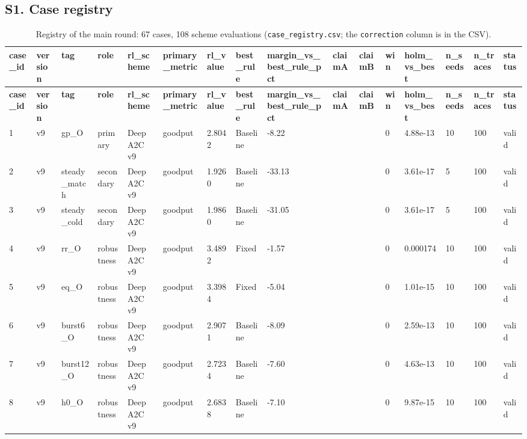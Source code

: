 \documentclass[10pt]{article}
\begin{document}
\begin{landscape}
\section{S1. Case registry}
\tiny
\setlength{\tabcolsep}{1.6pt}
\begin{longtable}{@{}llllllllllllllll@{}}
\caption{Registry of the main round: 67 cases, 108 scheme evaluations (\texttt{case\_registry.csv}; the \texttt{correction} column is in the CSV).}\\
\toprule
\textbf{case\_id} & \textbf{version} & \textbf{tag} & \textbf{role} & \textbf{rl\_scheme} & \textbf{primary\_metric} & \textbf{rl\_value} & \textbf{best\_rule} & \textbf{margin\_vs\_best\_rule\_pct} & \textbf{claimA} & \textbf{claimB} & \textbf{win} & \textbf{holm\_vs\_best} & \textbf{n\_seeds} & \textbf{n\_traces} & \textbf{status} \\
\midrule
\endfirsthead
\toprule
\textbf{case\_id} & \textbf{version} & \textbf{tag} & \textbf{role} & \textbf{rl\_scheme} & \textbf{primary\_metric} & \textbf{rl\_value} & \textbf{best\_rule} & \textbf{margin\_vs\_best\_rule\_pct} & \textbf{claimA} & \textbf{claimB} & \textbf{win} & \textbf{holm\_vs\_best} & \textbf{n\_seeds} & \textbf{n\_traces} & \textbf{status} \\
\midrule
\endhead
1 & v9 & gp\_O & primary & Deep A2C v9 & goodput & 2.8042 & Baseline & -8.22 &  &  & 0 & 4.88e-13 & 10 & 100 & valid \\
2 & v9 & steady\_match & secondary & Deep A2C v9 & goodput & 1.9260 & Baseline & -33.13 &  &  & 0 & 3.61e-17 & 5 & 100 & valid \\
3 & v9 & steady\_cold & secondary & Deep A2C v9 & goodput & 1.9860 & Baseline & -31.05 &  &  & 0 & 3.61e-17 & 5 & 100 & valid \\
4 & v9 & rr\_O & robustness & Deep A2C v9 & goodput & 3.4892 & Fixed & -1.57 &  &  & 0 & 0.000174 & 10 & 100 & valid \\
5 & v9 & eq\_O & robustness & Deep A2C v9 & goodput & 3.3984 & Fixed & -5.04 &  &  & 0 & 1.01e-15 & 10 & 100 & valid \\
6 & v9 & burst6\_O & robustness & Deep A2C v9 & goodput & 2.9071 & Baseline & -8.09 &  &  & 0 & 2.59e-13 & 10 & 100 & valid \\
7 & v9 & burst12\_O & robustness & Deep A2C v9 & goodput & 2.7234 & Baseline & -7.60 &  &  & 0 & 4.63e-13 & 10 & 100 & valid \\
8 & v9 & h0\_O & robustness & Deep A2C v9 & goodput & 2.6838 & Baseline & -7.10 &  &  & 0 & 9.87e-15 & 10 & 100 & valid \\

\end{longtable}
\end{landscape}
\end{document}
